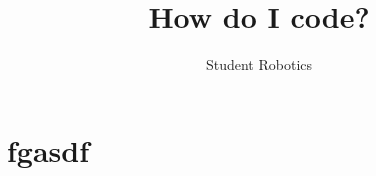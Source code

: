 \documentclass[a4paper,10pt]{article}
\title{How do I code?}
\author{Student Robotics}
\begin{document}
\section{fgasdf}
\end{document}

